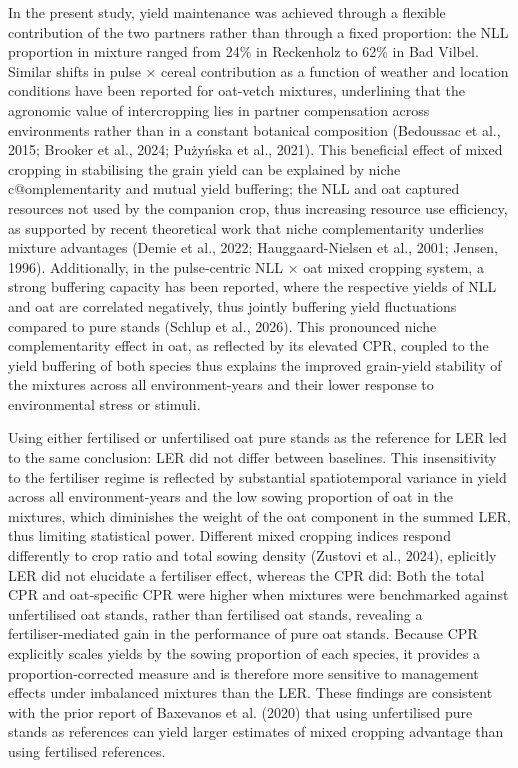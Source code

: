 \documentclass[
  british,
  a4paper,
  DIV=11,
  numbers=noendperiod]{scrreprt}
\begin{document}
In the present study, yield maintenance was achieved through a flexible
contribution of the two partners rather than through a fixed proportion:
the NLL proportion in mixture ranged from 24\% in Reckenholz to 62\% in
Bad Vilbel. Similar shifts in pulse × cereal contribution as a function
of weather and location conditions have been reported for oat-vetch
mixtures, underlining that the agronomic value of intercropping lies in
partner compensation across environments rather than in a constant
botanical composition (Bedoussac et al., 2015; Brooker et al., 2024;
Pużyńska et al., 2021). This beneficial effect of mixed cropping in
stabilising the grain yield can be explained by niche c@omplementarity
and mutual yield buffering; the NLL and oat captured resources not used
by the companion crop, thus increasing resource use efficiency, as
supported by recent theoretical work that niche complementarity
underlies mixture advantages (Demie et al., 2022; Hauggaard-Nielsen et
al., 2001; Jensen, 1996). Additionally, in the pulse-centric NLL × oat
mixed cropping system, a strong buffering capacity has been reported,
where the respective yields of NLL and oat are correlated negatively,
thus jointly buffering yield fluctuations compared to pure stands
(Schlup et al., 2026). This pronounced niche complementarity effect in
oat, as reflected by its elevated CPR, coupled to the yield buffering of
both species thus explains the improved grain-yield stability of the
mixtures across all environment-years and their lower response to
environmental stress or stimuli.

Using either fertilised or unfertilised oat pure stands as the reference
for LER led to the same conclusion: LER did not differ between
baselines. This insensitivity to the fertiliser regime is reflected by
substantial spatiotemporal variance in yield across all
environment-years and the low sowing proportion of oat in the mixtures,
which diminishes the weight of the oat component in the summed LER, thus
limiting statistical power. Different mixed cropping indices respond
differently to crop ratio and total sowing density (Zustovi et al.,
2024), eplicitly LER did not elucidate a fertiliser effect, whereas the
CPR did: Both the total CPR and oat‑specific CPR were higher when
mixtures were benchmarked against unfertilised oat stands, rather than
fertilised oat stands, revealing a fertiliser‑mediated gain in the
performance of pure oat stands. Because CPR explicitly scales yields by
the sowing proportion of each species, it provides a
proportion‑corrected measure and is therefore more sensitive to
management effects under imbalanced mixtures than the LER. These
findings are consistent with the prior report of Baxevanos et al. (2020)
that using unfertilised pure stands as references can yield larger
estimates of mixed cropping advantage than using fertilised references.
\end{document}
